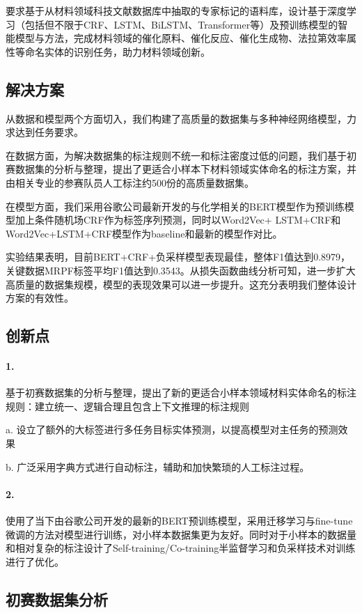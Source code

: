 \documentclass{article}
\begin{document}
	
	要求基于从材料领域科技文献数据库中抽取的专家标记的语料库，设计基于深度学习（包括但不限于CRF、LSTM、BiLSTM、Transformer等）及预训练模型的智能模型与方法，完成材料领域的催化原料、催化反应、催化生成物、法拉第效率属性等命名实体的识别任务，助力材料领域创新。
	\newpage
	\begin{center}
		\section{解决方案}
	\end{center}
	
	
	从数据和模型两个方面切入，我们构建了高质量的数据集与多种神经网络模型，力求达到任务要求。
	
	
在数据方面，为解决数据集的标注规则不统一和标注密度过低的问题，我们基于初赛数据集的分析与整理，提出了更适合小样本下材料领域实体命名的标注方案，并由相关专业的参赛队员人工标注约500份的高质量数据集。


在模型方面，我们采用谷歌公司最新开发的与化学相关的BERT模型作为预训练模型加上条件随机场CRF作为标签序列预测，同时以Word2Vec+ LSTM+CRF和Word2Vec+LSTM+CRF模型作为baseline和最新的模型作对比。


实验结果表明，目前BERT+CRF+负采样模型表现最佳，整体F1值达到0.8979，关键数据MRPF标签平均F1值达到0.3543。从损失函数曲线分析可知，进一步扩大高质量的数据集规模，模型的表现效果可以进一步提升。这充分表明我们整体设计方案的有效性。
\newpage
	\begin{center}
		\section{创新点}
	\end{center}
	\paragraph{1.} 基于初赛数据集的分析与整理，提出了新的更适合小样本领域材料实体命名的标注规则：建立统一、逻辑合理且包含上下文推理的标注规则
	
	
	a. 设立了额外的大标签进行多任务目标实体预测，以提高模型对主任务的预测效果
	
	
	b. 广泛采用字典方式进行自动标注，辅助和加快繁琐的人工标注过程。
\paragraph{2.} 使用了当下由谷歌公司开发的最新的BERT预训练模型，采用迁移学习与fine-tune微调的方法对模型进行训练，对小样本数据集更为友好。同时对于小样本的数据量和相对复杂的标注设计了Self-training/Co-training半监督学习和负采样技术对训练进行了优化。
\newpage
\begin{center}
	\section{初赛数据集分析}
\end{center}
\end{document}
